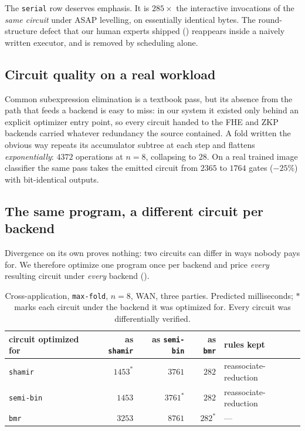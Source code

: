 \documentclass[11pt]{article}
\newcommand{\bt}[1]{\texttt{#1}}
\begin{document}
The \bt{serial} row deserves emphasis. It is $285\times$ the interactive
invocations of the \emph{same circuit} under ASAP levelling, on essentially
identical bytes. The round-structure defect that our human experts shipped
() reappears inside a naively written executor, and is removed
by scheduling alone.

\subsection{Circuit quality on a real workload}

Common subexpression elimination is a textbook pass, but its absence from the
path that feeds a backend is easy to miss: in our system it existed only
behind an explicit optimizer entry point, so every circuit handed to the FHE
and ZKP backends carried whatever redundancy the source contained. A fold
written the obvious way repeats its accumulator subtree at each step and
flattens \emph{exponentially}: $4372$ operations at $n{=}8$, collapsing to
$28$. On a real trained image classifier the same pass takes the emitted
circuit from $2365$ to $1764$ gates ($-25\%$) with bit-identical outputs.

\subsection{The same program, a different circuit per
backend}\label{sec:backend-aware}

Divergence on its own proves nothing: two circuits can differ in ways nobody
pays for. We therefore optimize one program once per backend and price
\emph{every} resulting circuit under \emph{every} backend
().

\begin{table}[t]
\centering
\caption{Cross-application, \bt{max-fold}, $n{=}8$, WAN, three parties.
Predicted milliseconds; $*$ marks each circuit under the backend it was
optimized for. Every circuit was differentially verified.}
\label{tab:crossapply}
\begin{tabular}{@{}lrrrl@{}}
\toprule
circuit optimized for & as \bt{shamir} & as \bt{semi-bin} & as \bt{bmr} & rules kept \\
\midrule
\bt{shamir} & $1453^{*}$ & $3761$ & $282$ & reassociate-reduction \\
\bt{semi-bin} & $1453$ & $3761^{*}$ & $282$ & reassociate-reduction \\
\bt{bmr} & $3253$ & $8761$ & $282^{*}$ & --- \\
\bottomrule
\end{tabular}
\end{table}
\end{document}
